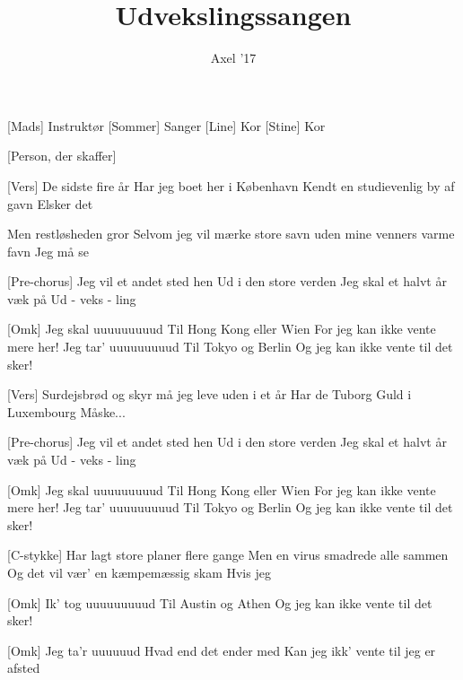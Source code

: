 \documentclass[a4paper,11pt]{article}
\title{Udvekslingssangen}
\author{Axel '17}
\begin{document}
\maketitle

\begin{roles}
[Mads] Instruktør
[Sommer] Sanger
[Line] Kor
[Stine] Kor
\end{roles}

\begin{props}
[Person, der skaffer]
\end{props}


\begin{song}
[Vers]%
De sidste fire år
Har jeg boet her i København
Kendt en studievenlig by af gavn
Elsker det

Men restløsheden gror
Selvom jeg vil mærke store savn
uden mine venners varme favn
Jeg må se

[Pre-chorus]%
Jeg vil et andet sted hen
Ud i den store verden
Jeg skal et halvt år væk på
Ud - veks - ling


[Omk]%
Jeg skal uuuuuuuuud
Til Hong Kong eller Wien
For jeg kan ikke vente mere her!
Jeg tar' uuuuuuuuud
Til Tokyo og Berlin
Og jeg kan ikke vente til det sker!

[Vers]%
Surdejsbrød og skyr
må jeg leve uden i et år
Har de Tuborg Guld i Luxembourg
Måske...

[Pre-chorus]%
Jeg vil et andet sted hen
Ud i den store verden
Jeg skal et halvt år væk på
Ud - veks - ling

[Omk]%
Jeg skal uuuuuuuuud
Til Hong Kong eller Wien
For jeg kan ikke vente mere her!
Jeg tar' uuuuuuuuud
Til Tokyo og Berlin
Og jeg kan ikke vente til det sker!

[C-stykke]%
Har lagt store planer flere gange
Men en virus smadrede alle sammen
Og det vil vær' en kæmpemæssig skam
Hvis jeg

[Omk]%
Ik' tog uuuuuuuuud
Til Austin og Athen
Og jeg kan ikke vente til det sker!

[Omk]%
Jeg ta’r uuuuuud
Hvad end det ender med
Kan jeg ikk’ vente til jeg er afsted  

\end{song}
\end{document}
